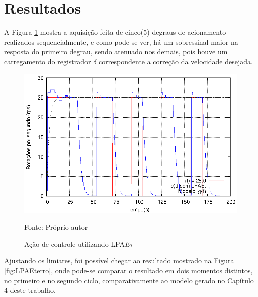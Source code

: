 \section{Resultados}

A Figura \ref{fig:acaoLPAEtDelta} mostra a aquisição feita
de cinco(5) degraus de acionamento
realizados sequencialmente, e como pode-se ver,
há um sobressinal maior na resposta do primeiro degrau,
sendo atenuado nos demais, 
pois houve um carregamento do registrador 
$\delta$ correspondente a correção da velocidade desejada.


\begin{figure}[!htb]%
\caption{Ação de controle utilizando LPA$E\tau$}
\vspace{-1cm}\center\includegraphics[scale=1.6]{./imagens/LPAEt-delta.eps}
\label{fig:acaoLPAEtDelta}

{\small Fonte: Próprio autor}
\end{figure}


Ajustando os limiares, foi possível chegar ao resultado mostrado na Figura \ref{fig:LPAEterro}, 
onde pode-se comparar o resultado em dois momentos
distintos, no primeiro e no segundo ciclo, 
comparativamente ao modelo gerado no 
Capítulo 4 deste trabalho.


